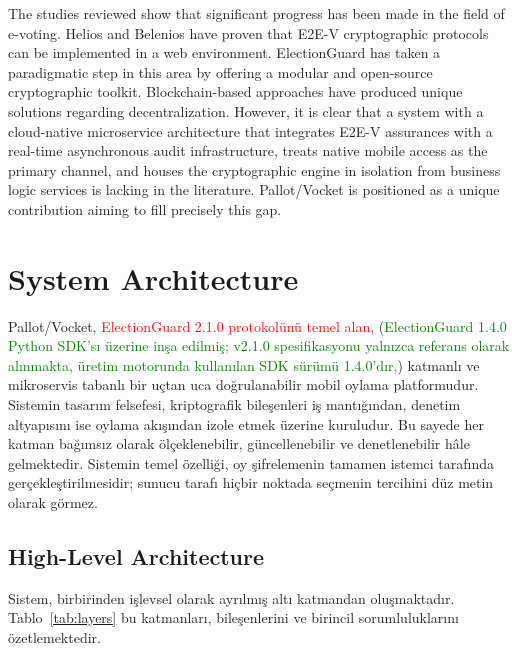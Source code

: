 \documentclass[a4paper,fleqn]{cas-sc}
\begin{document}
The studies reviewed show that significant progress has been made in the field of e-voting. Helios and Belenios have proven that E2E-V cryptographic protocols can be implemented in a web environment. ElectionGuard has taken a paradigmatic step in this area by offering a modular and open-source cryptographic toolkit. Blockchain-based approaches have produced unique solutions regarding decentralization. However, it is clear that a system with a cloud-native microservice architecture that integrates E2E-V assurances with a real-time asynchronous audit infrastructure, treats native mobile access as the primary channel, and houses the cryptographic engine in isolation from business logic services is lacking in the literature. Pallot/Vocket is positioned as a unique contribution aiming to fill precisely this gap.

\section{System Architecture}
\label{sec:architecture}

Pallot/Vocket,
\textcolor{red}{ElectionGuard 2.1.0 protokolünü temel alan,}
(\textcolor{green}{ElectionGuard 1.4.0 Python SDK'sı üzerine inşa edilmiş; v2.1.0 spesifikasyonu yalnızca referans olarak alınmakta, üretim motorunda kullanılan SDK sürümü 1.4.0'dır,})
katmanlı ve
mikroservis tabanlı bir uçtan uca doğrulanabilir mobil oylama platformudur.
Sistemin tasarım felsefesi, kriptografik bileşenleri iş mantığından,
denetim altyapısını ise oylama akışından izole etmek üzerine kuruludur.
Bu sayede her katman bağımsız olarak ölçeklenebilir, güncellenebilir ve
denetlenebilir hâle gelmektedir.
Sistemin temel özelliği, oy şifrelemenin tamamen istemci tarafında
gerçekleştirilmesidir; sunucu tarafı hiçbir noktada seçmenin tercihini
düz metin olarak görmez.

\subsection{High-Level Architecture}
\label{subsec:highlevel}

Sistem, birbirinden işlevsel olarak ayrılmış altı katmandan oluşmaktadır.
Tablo~\ref{tab:layers} bu katmanları, bileşenlerini ve birincil
sorumluluklarını özetlemektedir.
\end{document}
